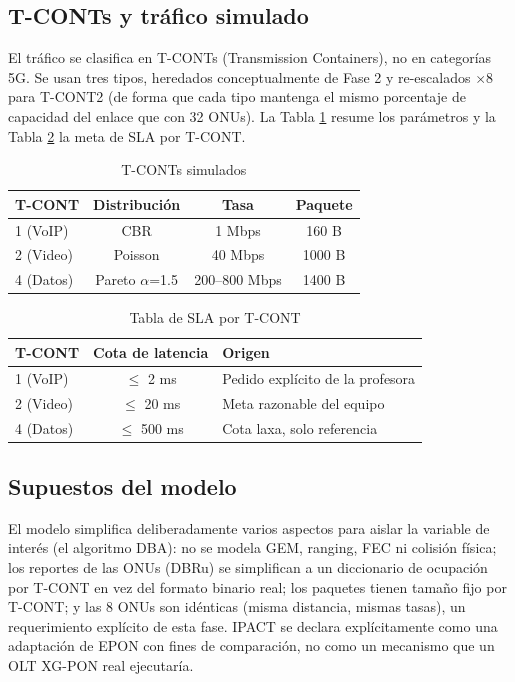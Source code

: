 \documentclass[conference]{IEEEtran}
\begin{document}
\subsection{T-CONTs y tráfico simulado}

El tráfico se clasifica en T-CONTs (Transmission Containers), no en
categorías 5G. Se usan tres tipos, heredados conceptualmente de Fase 2 y
re-escalados $\times 8$ para T-CONT2 (de forma que cada tipo mantenga el
mismo porcentaje de capacidad del enlace que con 32 ONUs). La Tabla
\ref{tab:tconts} resume los parámetros y la Tabla \ref{tab:sla} la meta de
SLA por T-CONT.

\begin{table}[h]
\centering
\caption{T-CONTs simulados}
\label{tab:tconts}
\begin{tabular}{lccc}
\toprule
T-CONT & Distribución & Tasa & Paquete \\
\midrule
1 (VoIP) & CBR & 1 Mbps & 160 B \\
2 (Video) & Poisson & 40 Mbps & 1000 B \\
4 (Datos) & Pareto $\alpha$=1.5 & 200--800 Mbps\footnotemark[1] & 1400 B \\
\bottomrule
\end{tabular}
\end{table}

\begin{table}[h]
\centering
\caption{Tabla de SLA por T-CONT}
\label{tab:sla}
\begin{tabular}{lcl}
\toprule
T-CONT & Cota de latencia & Origen \\
\midrule
1 (VoIP) & $\leq$ 2 ms & Pedido explícito de la profesora \\
2 (Video) & $\leq$ 20 ms & Meta razonable del equipo \\
4 (Datos) & $\leq$ 500 ms & Cota laxa, solo referencia \\
\bottomrule
\end{tabular}
\end{table}

\subsection{Supuestos del modelo}

El modelo simplifica deliberadamente varios aspectos para aislar la
variable de interés (el algoritmo DBA): no se modela GEM, ranging, FEC ni
colisión física; los reportes de las ONUs (DBRu) se simplifican a un
diccionario de ocupación por T-CONT en vez del formato binario real; los
paquetes tienen tamaño fijo por T-CONT; y las 8 ONUs son idénticas (misma
distancia, mismas tasas), un requerimiento explícito de esta fase. IPACT
se declara explícitamente como una adaptación de EPON con fines de
comparación, no como un mecanismo que un OLT XG-PON real ejecutaría.
\end{document}
